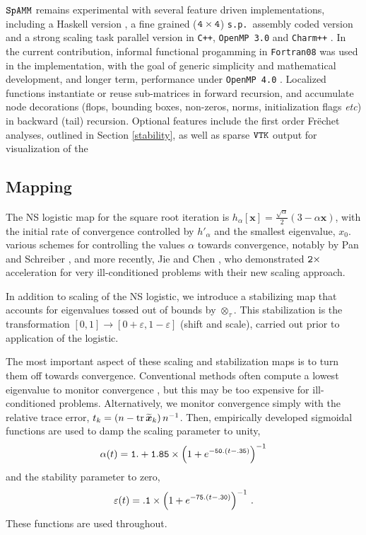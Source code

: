 \documentclass[letterpaper,twocolumn,amsmath,amsfont,amssymb,english,aps,jcp,preprintnumbers,groupaddress,nofootinbib,tightenlines,floatfix]{revtex4}
\newcommand{\mat}[1]{\boldsymbol{#1}}
\newcommand{\ot}{  {\scriptstyle \otimes}_{ \tau } }
\theoremstyle{plain}
\theoremstyle{remark}
\theoremstyle{plain}
\begin{document}
$\tt SpAMM$ remains experimental with several feature driven implementations, including a Haskell version \cite{}, 
a fine grained ($\tt 4\times 4$) {\tt s.p.}~assembly coded version \cite{} and  
a strong scaling task parallel version in {\tt C++}, {\tt OpenMP 3.0} and {\tt Charm++} \cite{}.  
In the current contribution, informal functional progamming in {\tt Fortran08} \cite{} was used in the implementation, 
with the goal of generic simplicity and mathematical development, and longer term, performance under {\tt OpenMP 4.0} 
\cite{}. Localized functions instantiate or reuse sub-matrices in forward recursion, and accumulate 
node decorations (flops, bounding boxes, non-zeros, norms, initialization flags {\em etc}) in 
backward (tail) recursion. 
Optional features include the first order Fr\"{e}chet analyses, outlined in Section \ref{stability}, 
as well as sparse $\tt VTK$ output for visualization of the 

\subsection{Mapping}\label{map}
The NS logistic map for the square root iteration is $h_\alpha[\mat{x}]=\frac{\sqrt{\alpha}}{2} \left(3-\alpha \mat{x} \right)$, 
with the initial rate of convergence controlled by $h'_\alpha$ and the smallest eigenvalue, $x_0$. 
various schemes for controlling the values $\alpha$ towards convergence, 
notably  by Pan and Schreiber \cite{Pan1991}, and more recently, Jie and Chen \cite{chen2014}, who demonstrated  $\tt 2 \times$
acceleration for very ill-conditioned problems with their new scaling approach. 

In addition to scaling of the NS logistic, we introduce a stabilizing map that accounts for eigenvalues 
tossed out of bounds by $\ot$. This stabilization is the transformation $[0,1] \rightarrow [0+\varepsilon, 1-\varepsilon]$
(shift and scale), carried out prior to application of the logistic.   

The most important aspect of these scaling and stabilization maps is to turn them off towards convergence.  Conventional methods 
often compute a lowest eigenvalue to monitor convergence \cite{Pan1991,chen2014}, but this may be too expensive for ill-conditioned problems. 
Alternatively, we monitor convergence simply with the relative trace error, 
$t_k = \left( n - {\rm tr} \, \widetilde{\mat{x}}_k \right) n^{-1}$.  
Then, empirically developed sigmoidal functions are used to damp the scaling parameter to unity, 
\begin{equation}
\alpha(t) = {\tt 1.} + {\tt 1.85}  \times \left( 1+e^{-{\tt 50.}(t-{\tt .35})}  \right)^{-1} 
\end{equation}
and the stability parameter to zero, 
\begin{equation}
\varepsilon(t) = {\tt .1} \times \left( 1+e^{-{\tt 75.}(t-{\tt .30})}  \right)^{-1} \, .
\end{equation}
These functions are used throughout. 
\end{document}
